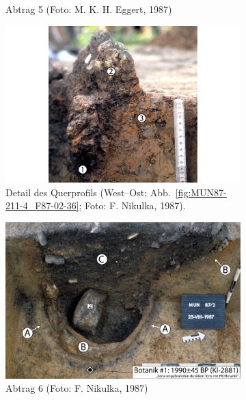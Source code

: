 \begin{figure}[p]
\begin{subfigure}{\columnwidth}
		\caption{Abtrag 5 (Foto: M. K. H. Eggert, 1987)}
		\label{fig:MUN87-211-5}
	\end{subfigure}\hfill
	\begin{subfigure}{\columnwidth}
		\includegraphics[width = \textwidth]{fig/MUN87-211-4_F87-02-31.pdf}
		\caption{Detail des Querprofils (West--Ost; Abb.~\ref{fig:MUN87-211-4_F87-02-36}; Foto: F. Nikulka, 1987).}
		\label{fig:MUN87-211-4_F87-02-31}
	\end{subfigure}
	\begin{subfigure}{\columnwidth}
		\centering
		\includegraphics[width = \textwidth]{fig/MUN87-211-6_F87-03-16.pdf}
		\caption{Abtrag 6 (Foto: F. Nikulka, 1987)}
		\label{fig:MUN87-211-6}
	\end{subfigure}\hfill
	\begin{subfigure}{\columnwidth}
		\centering

\end{subfigure}
\end{figure}
